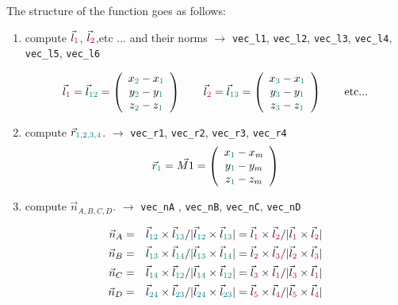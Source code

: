 The structure of the function goes as follows:
\begin{enumerate}
\item compute $\vec{l}_{\color{purple}1}$, $\vec{l}_{\color{purple}2}$,etc ... and their norms 
$\rightarrow$ \verb|vec_l1|, \verb|vec_l2|, \verb|vec_l3|, \verb|vec_l4|, \verb|vec_l5|, \verb|vec_l6|

\[
\vec{l}_{\color{purple}1} = \vec{l}_{\color{teal}12} = \left(
\begin{array}{c}
x_{\color{teal}2}-x_{\color{teal}1} \\
y_{\color{teal}2}-y_{\color{teal}1} \\
z_{\color{teal}2}-z_{\color{teal}1}
\end{array}
\right)
\qquad
\vec{l}_{\color{purple}2} = \vec{l}_{\color{teal}13} = \left(
\begin{array}{c}
x_{\color{teal}3}-x_{\color{teal}1} \\
y_{\color{teal}3}-y_{\color{teal}1} \\
z_{\color{teal}3}-z_{\color{teal}1}
\end{array}
\right)
\qquad
\textrm{etc...}
\]


\item compute $\vec{r}_{\color{teal} 1,2,3,4}$. $\rightarrow$ \verb|vec_r1|, \verb|vec_r2|, \verb|vec_r3|, \verb|vec_r4|
\[
\vec{r}_{\color{teal}1} = \vec{M1} = \left(
\begin{array}{c}
x_{\color{teal}1}-x_m \\
y_{\color{teal}1}-y_m \\
z_{\color{teal}1}-z_m
\end{array}
\right)
\]



\item compute $\vec{n}_{A,B,C,D}$. 
$\rightarrow$ \verb|vec_nA| , \verb|vec_nB|, \verb|vec_nC|, \verb|vec_nD|

\begin{eqnarray}
\vec{n}_A 
&=& \vec{l}_{\color{teal}12}\times\vec{l}_{\color{teal}13}/|\vec{l}_{\color{teal}12}\times\vec{l}_{\color{teal}13}|
= \vec{l}_{\color{purple}1}\times\vec{l}_{\color{purple}2}/| \vec{l}_{\color{purple}1}\times\vec{l}_{\color{purple}2}| \\
\vec{n}_B 
&=& \vec{l}_{\color{teal}13}\times\vec{l}_{\color{teal}14}/|\vec{l}_{\color{teal}13}\times\vec{l}_{\color{teal}14}|
= \vec{l}_{\color{purple}2}\times\vec{l}_{\color{purple}3}/|\vec{l}_{\color{purple}2}\times\vec{l}_{\color{purple}3}|  \\
\vec{n}_C 
&=& \vec{l}_{\color{teal}14}\times\vec{l}_{\color{teal}12}/|\vec{l}_{\color{teal}14}\times\vec{l}_{\color{teal}12}|   
= \vec{l}_{\color{purple}3}\times\vec{l}_{\color{purple}1}/|\vec{l}_{\color{purple}3}\times\vec{l}_{\color{purple}1}|   \\
\vec{n}_D 
&=& \vec{l}_{\color{teal}24}\times\vec{l}_{\color{teal}23}/|\vec{l}_{\color{teal}24}\times\vec{l}_{\color{teal}23}|   
= \vec{l}_{\color{purple}5}\times\vec{l}_{\color{purple}4}/|\vec{l}_{\color{purple}5}\times\vec{l}_{\color{purple}4}|
\end{eqnarray}



\end{enumerate}
